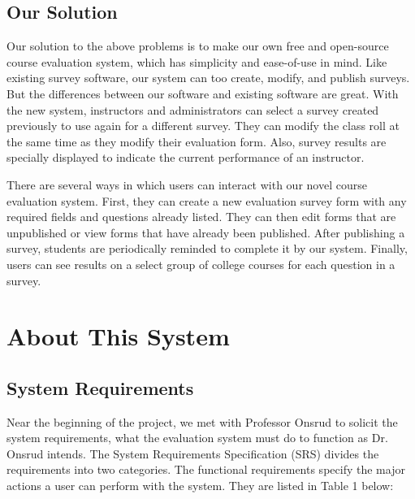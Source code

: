 \documentclass{article}
\begin{document}
\subsection{Our Solution}

Our solution to the above problems is to make our own free and open-source course evaluation system, which has simplicity and ease-of-use in mind. Like existing survey software, our system can too create, modify, and publish surveys. But the differences between our software and existing software are great. With the new system, instructors and administrators can select a survey created previously to use again for a different survey. They can modify the class roll at the same time as they modify their evaluation form. Also, survey results are specially displayed to indicate the current performance of an instructor.

There are several ways in which users can interact with our novel course evaluation system. First, they can create a new evaluation survey form with any required fields and questions already listed. They can then edit forms that are unpublished or view forms that have already been published. After publishing a survey, students are periodically reminded to complete it by our system. Finally, users can see results on a select group of college courses for each question in a survey.

\newpage

\section{About This System}

\subsection{System Requirements}

Near the beginning of the project, we met with Professor Onsrud to solicit the system requirements, what the evaluation system must do to function as Dr. Onsrud intends. The System Requirements Specification (SRS) divides the requirements into two categories. The functional requirements specify the major actions a user can perform with the system. They are listed in Table 1 below:
\end{document}
